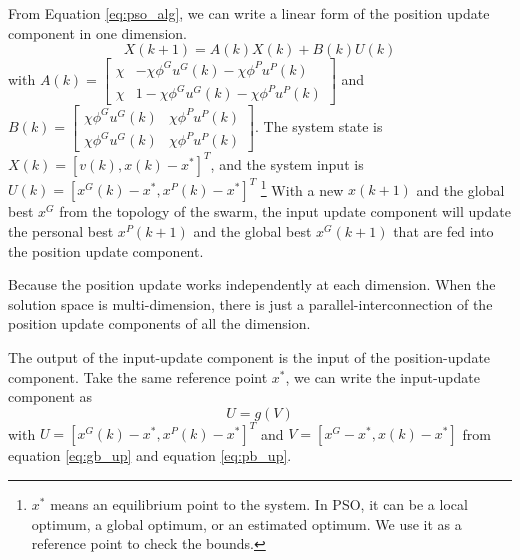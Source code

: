 From Equation \eqref{eq:pso_alg}, we can write a linear form of the position update component in one dimension.
\begin{equation}
\label{eq:pso_up_linalg_simp}
X(k+1) = A(k) X(k) + B(k) U(k)
\end{equation}
with
$ A(k) = \begin{bmatrix}
\chi & - \chi \phi^{G} u^{G}(k) - \chi \phi^{P} u^{P}(k)
\\ 
\chi & 1 - \chi \phi^{G} u^{G}(k) - \chi \phi^{P} u^{P}(k)
\end{bmatrix} $
and
$ B(k) = \begin{bmatrix}
\chi \phi^{G} u^{G}(k) & \chi \phi^{P} u^{P}(k)
\\ 
\chi \phi^{G} u^{G}(k) & \chi \phi^{P} u^{P}(k)
\end{bmatrix} $.
The system state is $ X(k) = [ v(k), x(k) - x^{*} ]^{T} $, and the system input is $ U(k) = [ x^{G}(k) - x^{*} , x^{P}(k) - x^{*} ]^{T} $
\footnote{$ x^{*} $ means an equilibrium point to the system.
In PSO, it can be a local optimum, a global optimum, or an estimated optimum.
We use it as a reference point to check the bounds.}
With a new $ x(k+1) $ and the global best $ x^{G} $ from the topology of the swarm, the input update component will update the personal best $ x^{P}(k+1) $ and the global best $ x^{G}(k+1) $ that are fed into the position update component.

Because the position update works independently at each dimension.
When the solution space is multi-dimension, there is just a parallel-interconnection of the position update components of all the dimension.

The output of the input-update component is the input of the position-update component.
Take the same reference point $ x^{*} $, we can write the input-update component as 
\begin{equation}
\label{eq:pso_input_up}
U = g(V)
\end{equation}
with $ U = [ x^{G}(k) - x^{*} , x^{P}(k) - x^{*} ]^{T} $ 
and $ V = [ x^{G} - x^{*}, x(k) - x^{*} ] $
from equation \eqref{eq:gb_up} and equation \eqref{eq:pb_up}. 
